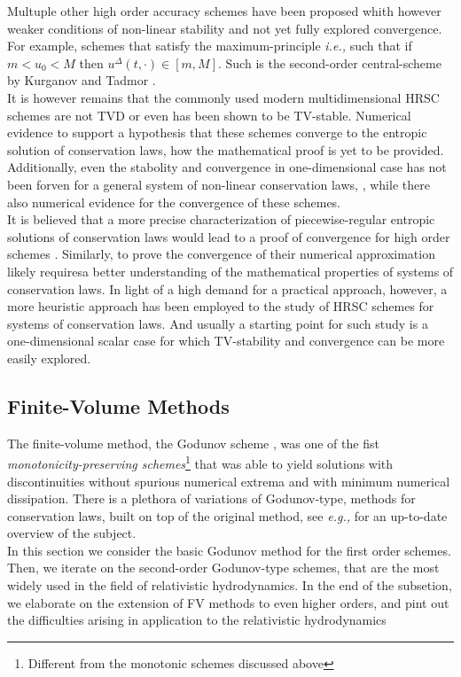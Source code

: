\documentclass[11pt,a4paper,headinclude=true,DIV=14,BCOR=8mm,chapterprefix,listof=totoc,twoside,openright,abstracton]{scrbook}
\begin{document}
Multuple other high order accuracy schemes have been proposed whith however weaker conditions of non-linear stability and not yet fully explored convergence. For example, schemes that satisfy the maximum-principle \textit{i.e.,} such that if $m < u_0 < M$ then $u^{\Delta}(t,\cdot)\in[m, M]$. Such is the second-order central-scheme by Kurganov and Tadmor \cite{Kurganov:2000}. \\

It is however remains that the commonly used modern multidimensional HRSC schemes are not TVD or even has been shown to be TV-stable. Numerical evidence to support a hypothesis that these schemes converge to the entropic solution of conservation laws, how the mathematical proof is yet to be provided. Additionally, even the stabolity and convergence in one-dimensional case has not been forven for a general system of non-linear conservation laws, \cite{LeVeque:2002}, while there also numerical evidence for the convergence of these schemes. \\

It is believed that a more precise characterization of piecewise-regular entropic solutions of conservation laws would lead to a proof of convergence for high order schemes \cite{Tadmor1998}. Similarly, to prove the convergence of their numerical approximation likely requiresa  better understanding of the mathematical properties of systems of conservation laws. In light of a high demand for a practical approach, however, a more heuristic approach has been employed to the study of HRSC schemes for systems of conservation laws. And usually a starting point for such study is a one-dimensional scalar case for which TV-stability and convergence can be more easily explored.

\subsection{Finite-Volume Methods}


The finite-volume method, the Godunov scheme \cite{Godunov:1959}, was one of the fist \textit{monotonicity-preserving schemes}\footnote{Different from the monotonic schemes discussed above} that was able to yield solutions with discontinuities without spurious numerical extrema and with minimum numerical dissipation. There is a plethora of variations of Godunov-type, methods for conservation laws, built on top of the original method, see \textit{e.g.,} \cite{Toro:1999} for an up-to-date overview of the subject. \\
In this section we consider the basic Godunov method for the first order schemes. Then, we iterate on the second-order Godunov-type schemes, that are the most widely used in the field of relativistic hydrodynamics. In the end of the subsetion, we elaborate on the extension of FV methods to even higher orders, and pint out the difficulties arising in application to the relativistic hydrodynamics 
\end{document}
